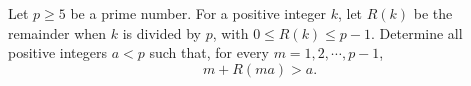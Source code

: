 Let $p \ge 5$ be a prime number. For a positive integer $k$, let $R(k)$ be the remainder when $k$ is divided by $p$, with $0 \le R(k) \le p-1$. Determine all positive integers $a < p$ such that, for every $m = 1, 2, \cdots, p-1$, \[ m + R(ma) > a. \]